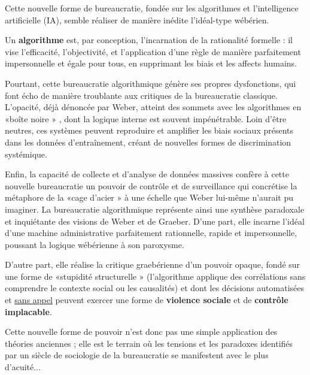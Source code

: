Cette nouvelle forme de bureaucratie, fondée sur les algorithmes et l'intelligence artificielle (IA), semble réaliser de manière inédite l'idéal-type wébérien. 

Un \textbf{algorithme} est, par conception, l'incarnation de la rationalité formelle : il vise l'efficacité, l'objectivité, et l'application d'une règle de manière parfaitement impersonnelle et égale pour tous, en supprimant les biais et les affects humains.

Pourtant, cette bureaucratie algorithmique génère ses propres dysfonctions, qui font écho de manière troublante aux critiques de la bureaucratie classique. L'opacité, déjà dénoncée par Weber, atteint des sommets avec les algorithmes en «boîte noire » , dont la logique interne est souvent impénétrable. Loin d'être neutres, ces systèmes peuvent reproduire et amplifier les biais sociaux présents dans les données d'entraînement, créant de nouvelles formes de discrimination systémique.

Enfin, la capacité de collecte et d'analyse de données massives confère à cette nouvelle bureaucratie un pouvoir de contrôle et de surveillance qui concrétise la métaphore de la «cage d'acier »  à une échelle que Weber lui-même n'aurait pu imaginer. La bureaucratie algorithmique représente ainsi une synthèse paradoxale et inquiétante des visions de Weber et de Graeber. D'une part, elle incarne l'idéal d'une machine administrative parfaitement rationnelle, rapide et impersonnelle, poussant la logique wébérienne à son paroxysme. 

D'autre part, elle réalise la critique graebérienne d'un pouvoir opaque, fondé sur une forme de «stupidité structurelle »  (l'algorithme applique des corrélations sans comprendre le contexte social ou les causalités) et dont les décisions automatisées et \underline{sans appel} peuvent exercer une forme de \textbf{violence sociale} et de \textbf{contrôle implacable}.

Cette nouvelle forme de pouvoir n'est donc pas une simple application des théories anciennes ; elle est le terrain où les tensions et les paradoxes identifiés par un siècle de sociologie de la bureaucratie se manifestent avec le plus d'acuité...
